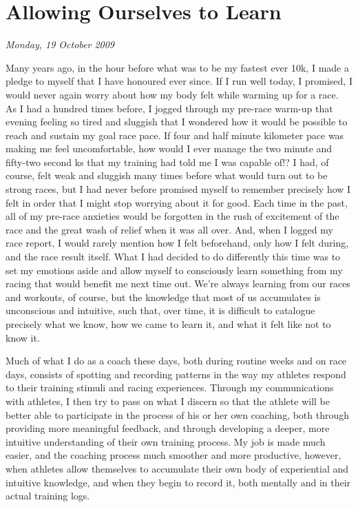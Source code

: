 \chapter{Allowing Ourselves to Learn}
\textit{Monday, 19 October 2009}
\bigskip



Many years ago, in the hour before what was to be my fastest ever 10k, I made a pledge to myself that I have honoured ever since. If I run well today, I promised, I would never again worry about how my body felt while warming up for a race. As I had a hundred times before, I jogged through my pre-race warm-up that evening feeling so tired and sluggish that I wondered how it would be possible to reach and sustain my goal race pace. If four and half minute kilometer pace was making me feel uncomfortable, how would I ever manage the two minute and fifty-two second ks that my training had told me I was capable of!? I had, of course, felt weak and sluggish many times before what would turn out to be strong races, but I had never before promised myself to remember precisely how I felt in order that I might stop worrying about it for good. Each time in the past, all of my pre-race anxieties would be forgotten in the rush of excitement of the race and the great wash of relief when it was all over. And, when I logged my race report, I would rarely mention how I felt beforehand, only how I felt during, and the race result itself. What I had decided to do differently this time was to set my emotions aside and allow myself to consciously learn something from my racing that would benefit me next time out. We're always learning from our races and workouts, of course, but the knowledge that most of us accumulates is unconscious and intuitive, such that, over time, it is difficult to catalogue precisely what we know, how we came to learn it, and what it felt like not to know it.

Much of what I do as a coach these days, both during routine weeks and on race days, consists of spotting and recording patterns in the way my athletes respond to their training stimuli and racing experiences. Through my communications with athletes, I then try to pass on what I discern so that the athlete will be better able to participate in the process of his or her own coaching, both through providing more meaningful feedback, and through developing a deeper, more intuitive understanding of their own training process. My job is made much easier, and the coaching process much smoother and more productive, however, when athletes allow themselves to accumulate their own body of experiential and intuitive knowledge, and when they begin to record it, both mentally and in their actual training logs.

